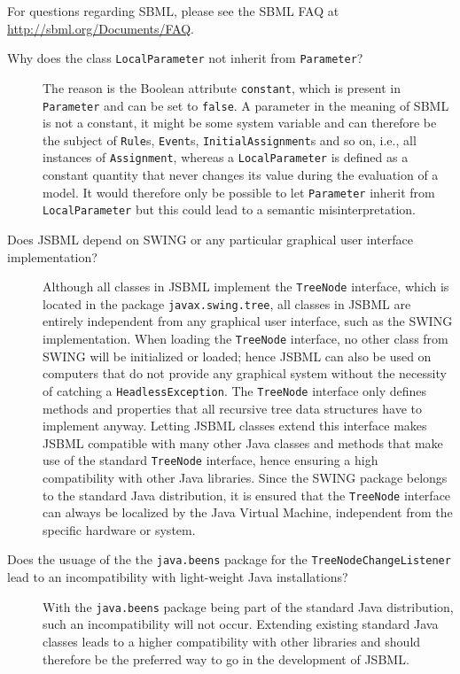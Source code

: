 For questions regarding SBML, please see the SBML FAQ at
\url{http://sbml.org/Documents/FAQ}.
\begin{description}
\item[Why does the class \texttt{LocalParameter} not inherit from
\texttt{Parameter}?]
The reason is the Boolean
attribute \texttt{constant}, which is present in
\texttt{Parameter} and can be set to \texttt{false}. A parameter in the meaning
of SBML is not a constant, it might be some system variable
and can therefore be the subject of \texttt{Rule}s,
\texttt{Event}s, \texttt{InitialAssignment}s
and so on, i.e., all instances of \texttt{Assignment},
whereas a \texttt{LocalParameter} is defined as a constant quantity that never
changes its value during the evaluation of a model. It would
therefore only be possible to let \texttt{Parameter} inherit from
\texttt{LocalParameter} but this could lead to a semantic misinterpretation.


\item[Does JSBML depend on SWING or any particular graphical user interface
implementation?]
Although all classes in JSBML implement the \texttt{TreeNode} interface, which
is located in the package \texttt{javax.swing.tree}, all classes in JSBML are
entirely independent from any graphical user interface, such as the SWING
implementation. When loading the \texttt{TreeNode} interface, no other class
from SWING will be initialized or loaded; hence JSBML can also be used on
computers that do not provide any graphical system without the necessity of
catching a \texttt{HeadlessException}. The \texttt{TreeNode} interface only
defines methods and properties that all recursive tree data structures have to
implement anyway. Letting JSBML classes extend this interface makes JSBML
compatible with many other Java classes and methods that make use of the
standard \texttt{TreeNode} interface, hence ensuring a high compatibility with
other Java libraries. Since the SWING package belongs to the standard
Java\texttrademark{} distribution, it is ensured that the \texttt{TreeNode}
interface can always be localized by the Java Virtual Machine,
independent from the specific hardware or system.

\item[Does the usuage of the the \texttt{java.beens} package for the
\texttt{TreeNodeChangeListener} lead to an incompatibility with light-weight
Java installations?]
With the \texttt{java.beens} package being part of the standard Java
distribution, such an incompatibility will not occur. Extending existing
standard Java classes leads to a higher compatibility with other libraries and
should therefore be the preferred way to go in the development of JSBML.
\end{description}
